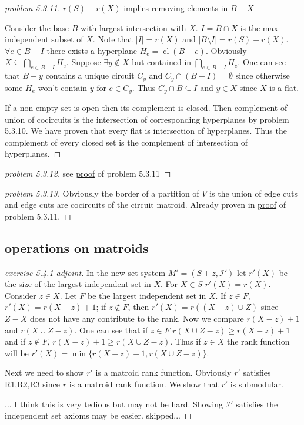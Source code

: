 \documentclass[12pt]{article}
\DeclareMathOperator{\cl}{cl}   %
\begin{document}
\begin{proof}[problem 5.3.11]\label{proof:5311}
    {\scriptsize $r(S)-r(X)$ implies removing elements in $B-X$}

    Consider the base $B$ with largest intersection with $X$. $I=B\cap X$ is the max independent subset of $X$. Note that $|I|=r(X)$ and $|B\setminus I|=r(S)-r(X)$. $\forall e\in B-I$ there exists a hyperplane $H_e=\cl(B-e)$. Obviously $X\subseteq \bigcap_{e\in B-I}H_e$. Suppose $\exists y\notin X$ but contained in $\bigcap_{e\in B-I}H_e$. One can see that $B+y$ contains a unique circuit $C_y$ and $C_y\cap (B-I)=\emptyset$ since otherwise some $H_e$ won't contain $y$ for $e\in C_y$. Thus $C_y\cap B\subseteq I$ and $y\in X$ since $X$ is a flat.

    If a non-empty set is open then its complement is closed. Then complement of union of cocircuits is the intersection of corresponding hyperplanes by problem 5.3.10. We have proven that every flat is intersection of hyperplanes. Thus the complement of every closed set is the complement of intersection of hyperplanes.
\end{proof}
\begin{proof}[problem 5.3.12]
    see \hyperref[proof:5311]{proof} of problem 5.3.11
\end{proof}
\begin{proof}[problem 5.3.13]
    Obviously the border of a partition of $V$ is the union of edge cuts and edge cuts are cocircuits of the circuit matroid. Already proven in \hyperref[proof:5311]{proof} of problem 5.3.11.
\end{proof}
\subsection{operations on matroids}
\begin{proof}[exercise 5.4.1 adjoint]
    In the new set system $M'=(S+z,\mathcal I')$ let $r'(X)$ be the size of the largest independent set in $X$. For $X\in S$ $r'(X)=r(X)$. Consider $z\in X$. Let $F$ be the largest independent set in $X$. If $z\in F$, $r'(X)=r(X-z)+1$; if $z\notin F$, then $r'(X)=r((X-z)\cup Z)$ since $Z-X$ does not have any contribute to the rank. Now we compare $r(X-z)+1$ and $r(X\cup Z -z)$. One can see that if $z\in F$ $r(X\cup Z -z)\geq r(X-z)+1$ and if $z\notin F$, $r(X-z)+1 \geq r(X\cup Z -z)$. Thus if $z\in X$ the rank function will be $r'(X)=\min\{r(X-z)+1, r(X\cup Z -z)\}$.

    Next we need to show $r'$ is a matroid rank function. Obviously $r'$ satisfies R1,R2,R3 since $r$ is a matroid rank function. We show that $r'$ is submodular.

    ... I think this is very tedious but may not be hard. Showing $\mathcal I'$ satisfies the independent set axioms may be easier. skipped...
\end{proof}
\end{document}
